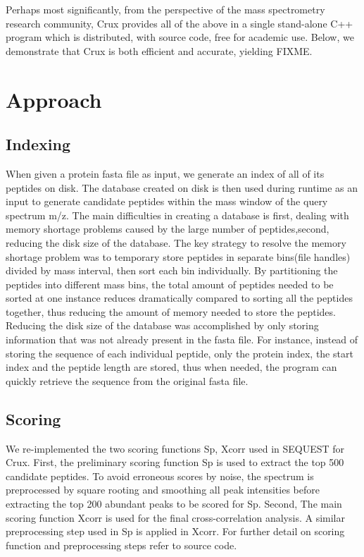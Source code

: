 \documentclass{bioinfo}
\begin{document}
Perhaps most significantly, from the perspective of the mass
spectrometry research community, Crux provides all of the above in a
single stand-alone C++ program which is distributed, with source code,
free for academic use.  Below, we demonstrate that Crux is both
efficient and accurate, yielding FIXME.

\section{Approach}

\subsection{Indexing}
When given a protein fasta file as input, we generate an index of all
of its peptides on disk. The database created on disk is then used
during runtime as an input to generate candidate peptides within the
mass window of the query spectrum m/z. The main difficulties in
creating a database is first, dealing with memory shortage problems
caused by the large number of peptides,second, reducing the disk size
of the database. The key strategy to resolve the memory shortage
problem was to temporary store peptides in separate bins(file handles)
divided by mass interval, then sort each bin individually. By
partitioning the peptides into different mass bins, the total amount
of peptides needed to be sorted at one instance reduces dramatically
compared to sorting all the peptides together, thus reducing the
amount of memory needed to store the peptides. Reducing the disk size
of the database was accomplished by only storing information that was
not already present in the fasta file. For instance, instead of
storing the sequence of each individual peptide, only the protein
index, the start index and the peptide length are stored, thus when
needed, the program can quickly retrieve the sequence from the
original fasta file.

\subsection{Scoring}
We re-implemented the two scoring functions Sp, Xcorr used in SEQUEST
for Crux.  First, the preliminary scoring function Sp is used to
extract the top 500 candidate peptides. To avoid erroneous scores by
noise, the spectrum is preprocessed by square rooting and smoothing
all peak intensities before extracting the top 200 abundant peaks to
be scored for Sp.  Second, The main scoring function Xcorr is used for
the final cross-correlation analysis. A similar preprocessing step
used in Sp is applied in Xcorr. For further detail on scoring function
and preprocessing steps refer to source code.
\end{document}
